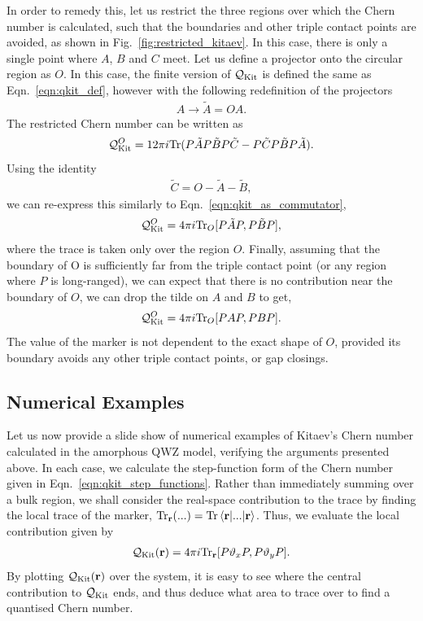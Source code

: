 In order to remedy this, let us restrict the three regions over which the Chern number is calculated, such that the boundaries and other triple contact points are avoided, as shown in Fig.~\ref{fig:restricted_kitaev}. In this case, there is only a single point where $A$, $B$ and $C$ meet. Let us define a projector onto the circular region as $O$. In this case, the finite version of $\mathcal Q_{\textup{Kit}}$ is defined the same as Eqn.~\ref{eqn:qkit_def}, however with the following redefinition of the projectors
\begin{align}
    A \rightarrow \tilde A = OA.
\end{align}
The restricted Chern number can be written as
\begin{align} \label{eqn:qkit_def_restricted}
    \mathcal Q_{\textup{Kit}}^O = 12\pi i \textup{Tr}( 
        P\tilde AP\tilde BP\tilde C - 
        P\tilde CP\tilde BP\tilde A).
\end{align}
Using the identity
\begin{align}
    \tilde C = O - \tilde A - \tilde B,
\end{align}
we can re-express this similarly to Eqn.~\ref{eqn:qkit_as_commutator},
\begin{align}
    \mathcal Q_{\textup{Kit}}^O = 4 \pi i \textup{Tr}_O[
        P\tilde AP, P\tilde BP
    ],
\end{align}
where the trace is taken only over the region $O$. Finally, assuming that the boundary of O is sufficiently far from the triple contact point (or any region where $P$ is long-ranged), we can expect that there is no contribution near the boundary of $O$, we can drop the tilde on $A$ and $B$ to get,
\begin{align} \label{eqn:qkit_finite_step}
    \mathcal Q_{\textup{Kit}}^O = 4 \pi i \textup{Tr}_O[
        P AP, P BP
    ].
\end{align}
The value of the marker is not dependent to the exact shape of $O$, provided its boundary avoids any other triple contact points, or gap closings.

\subsection{Numerical Examples}

Let us now provide a slide show of numerical examples of Kitaev's Chern number calculated in the amorphous QWZ model, verifying the arguments presented above. In each case, we calculate the step-function form of the Chern number given in Eqn.~\ref{eqn:qkit_step_functions}. Rather than immediately summing over a bulk region, we shall consider the real-space contribution to the trace by finding the local trace of the marker, $\textup{Tr}_{\textbf r} ( ... ) = \textup{Tr} \braket{\textbf r | ... | \textbf r}$. Thus, we evaluate the local contribution given by
\begin{align}
    \mathcal Q_{\textup{Kit}} (\textbf r) = 4 \pi i \textup{Tr}_{\textbf r}[
        P \vartheta_x P, P \vartheta_y P
    ].
\end{align}
By plotting $\mathcal Q_{\textup{Kit}} (\textbf r)$ over the system, it is easy to see where the central contribution to $\mathcal Q_{\textup{Kit}}$ ends, and thus deduce what area to trace over to find a quantised Chern number. 


